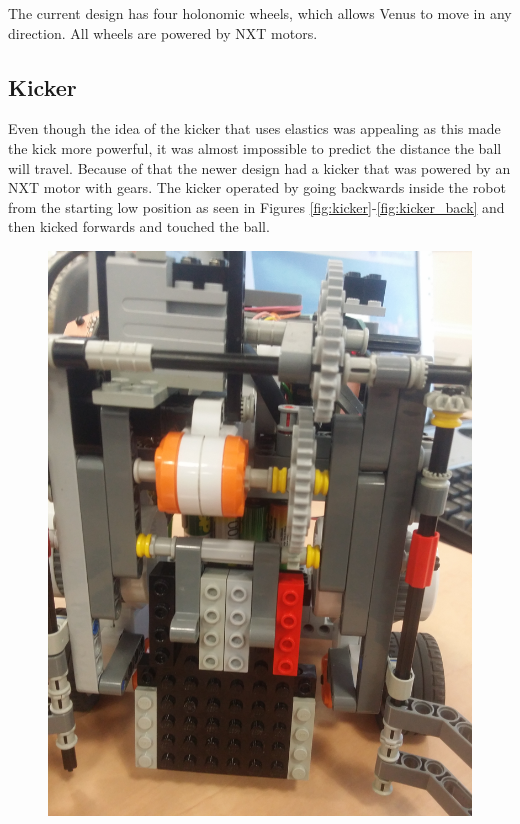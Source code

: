 \documentclass[a4paper,12pt]{article}
\begin{document}
The current design has four holonomic wheels, which allows Venus to move in any direction. All wheels are powered by NXT motors.

\subsection{Kicker}
Even though the idea of the kicker that uses elastics was appealing as this made
the kick more powerful, it was almost impossible to predict the distance the
ball will travel. Because of that the newer design had a
kicker that was powered by an NXT motor with gears. The kicker operated by going backwards inside the robot from the starting low position as seen in Figures \ref{fig:kicker}-\ref{fig:kicker_back} and then kicked
forwards and touched the ball.
\begin{figure}[ht]
	\centering
	\begin{minipage}[b]{.3\textwidth}
        \centering
		\includegraphics[scale=0.04, angle=-90]{kick_front.jpg}

\end{minipage}
\end{figure}
\end{document}

